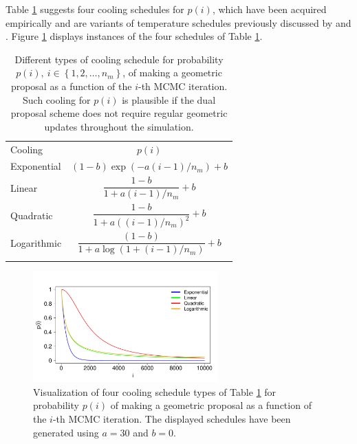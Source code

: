 \documentclass[twoside,11pt]{article}
\begin{document}
Table \ref{tab:cooling_schedules} suggests four cooling schedules for $p(i)$, which have been acquired empirically and are 
variants of temperature schedules previously discussed by \cite{haj__coo} and \cite{nou_and__aco}.
Figure \ref{fig:cooling_schedules} displays instances of the four schedules of Table \ref{tab:cooling_schedules}.

\begin{table}[t]
\centering
\begin{tabular}{l|c}
\hline\noalign{\smallskip}
Cooling & $p(i)$\\
\noalign{\smallskip}\hline\noalign{\smallskip}
Exponential & $(1-b)\exp(-a(i-1)/n_m)+b$\\
\noalign{\smallskip}\hline\noalign{\smallskip}
Linear & $\dfrac{1-b}{1+a(i-1)/n_m}+b$\\
\noalign{\smallskip}\hline\noalign{\smallskip}
Quadratic & $\dfrac{1-b}{1+a((i-1)/n_m)^2}+b$\\
\noalign{\smallskip}\hline\noalign{\smallskip}
Logarithmic & $\dfrac{(1-b)}{1+a\log(1+(i-1)/n_m)}+b$\\
\noalign{\smallskip}\hline
\end{tabular}
\caption{
Different types of cooling schedule for probability $p(i),~i\in\left\{1,2,\dots,n_m\right\}$, of making a geometric proposal 
as a function of the $i$-th MCMC iteration. Such cooling for $p(i)$ is plausible if the dual proposal scheme does not 
require regular geometric updates throughout the simulation.
}
\label{tab:cooling_schedules}
\end{table}

\begin{figure}[t]
\centering
\includegraphics[width=2.8in]{cooling_schedules.pdf}
\caption{
Visualization of four cooling schedule types of Table \ref{tab:cooling_schedules} for probability $p(i)$ of making a 
geometric proposal as a function of the $i$-th MCMC iteration. The displayed schedules have been generated using $a=30$ and 
$b=0$.
}
\label{fig:cooling_schedules}
\end{figure}
\end{document}
